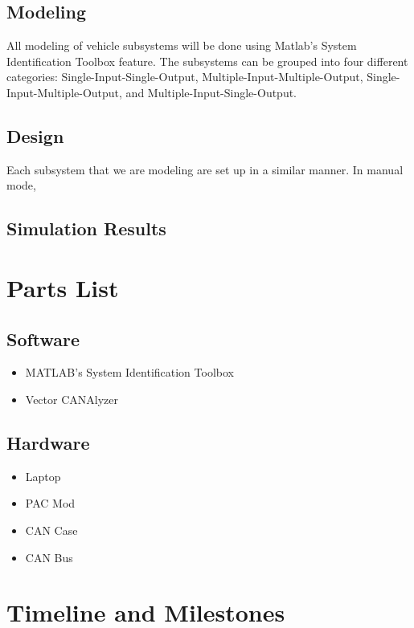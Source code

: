 \documentclass[letterpaper,12pt]{article}   %
\begin{document}
 \subsection{Modeling} \label{sec:model}
 All modeling of vehicle subsystems will be done using Matlab's System Identification Toolbox feature. The subsystems can be grouped into four different categories: Single-Input-Single-Output, Multiple-Input-Multiple-Output, Single-Input-Multiple-Output, and Multiple-Input-Single-Output. 

\subsection{Design} \label{sec:design}
Each subsystem that we are modeling are set up in a similar manner. In manual mode, 

\subsection{Simulation Results} \label{sec:simresults}



\section{Parts List}
	\subsection{Software}
	\begin{itemize}
    \item MATLAB's System Identification Toolbox 
    \item Vector CANAlyzer 
 \end{itemize} 
	
	\subsection{Hardware} 
	\begin{itemize}
    \item Laptop
    \item PAC Mod 
    \item CAN Case 
    \item CAN Bus 
 \end{itemize}

\section{Timeline and Milestones} \label{sec:timeline}
\end{document}
